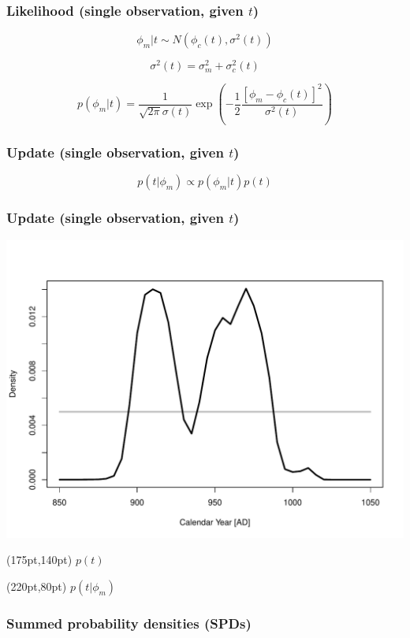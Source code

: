 \documentclass{beamer}
\begin{document}
\begin{frame}[t]
  \frametitle{Likelihood (single observation, given $t$)}
  \Large
  \begin{equation}
    \phi_m|t \sim N(\phi_c(t),\sigma^2(t))
  \end{equation}
  
  \bigskip
  
  \begin{equation}
    \sigma^2(t) = \sigma^2_m + \sigma^2_c(t)
  \end{equation}
  
  \bigskip
  
  \begin{equation}
    p(\phi_m|t) = \frac{1}{\sqrt{2\pi}\sigma(t)}\exp{(-\frac{1}{2}\frac{[\phi_m-\phi_c(t)]^2}{\sigma^2(t)})}
  \end{equation}
 
  \normalsize
\end{frame}

\begin{frame}[t]
  \frametitle{Update (single observation, given $t$)}
  \Large
  \begin{equation}
    p(t|\phi_m) \propto p(\phi_m|t) p(t)
  \end{equation}
  \normalsize
\end{frame}

\begin{frame}[t]
  \frametitle{Update (single observation, given $t$)}
    \includegraphics[height=.85\textheight]{single_obs_inf_plot3.pdf}
    \begin{textblock*}{100pt}(175pt,140pt)
      \Large $p(t)$ \normalsize
	\end{textblock*}
    \begin{textblock*}{100pt}(220pt,80pt)
      \Large $p(t|\phi_m)$ \normalsize
	\end{textblock*}
\end{frame}

\begin{frame}[t]
  \frametitle{Summed probability densities (SPDs)}
\end{frame}
\end{document}
